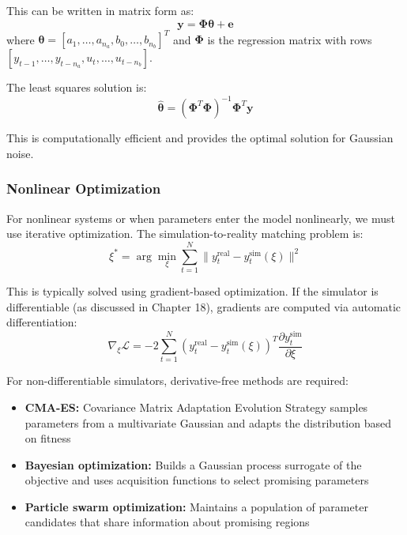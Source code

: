 This can be written in matrix form as:
\begin{equation}
\mathbf{y} = \mathbf{\Phi} \boldsymbol{\theta} + \mathbf{e}
\end{equation}
where $\boldsymbol{\theta} = [a_1, \ldots, a_{n_a}, b_0, \ldots, b_{n_b}]^T$ and $\mathbf{\Phi}$ is the regression matrix with rows $[y_{t-1}, \ldots, y_{t-n_a}, u_t, \ldots, u_{t-n_b}]$.

The least squares solution is:
\begin{equation}
\hat{\boldsymbol{\theta}} = (\mathbf{\Phi}^T \mathbf{\Phi})^{-1} \mathbf{\Phi}^T \mathbf{y}
\label{eq:least_squares_sysid}
\end{equation}

This is computationally efficient and provides the optimal solution for Gaussian noise.

\subsubsection{Nonlinear Optimization}

For nonlinear systems or when parameters enter the model nonlinearly, we must use iterative optimization. The simulation-to-reality matching problem is:
\begin{equation}
\xi^* = \arg\min_\xi \sum_{t=1}^{N} \| y_t^{\text{real}} - y_t^{\text{sim}}(\xi) \|^2
\end{equation}

This is typically solved using gradient-based optimization. If the simulator is differentiable (as discussed in Chapter 18), gradients are computed via automatic differentiation:
\begin{equation}
\nabla_\xi \mathcal{L} = -2 \sum_{t=1}^{N} (y_t^{\text{real}} - y_t^{\text{sim}}(\xi))^T \frac{\partial y_t^{\text{sim}}}{\partial \xi}
\end{equation}

For non-differentiable simulators, derivative-free methods are required:
\begin{itemize}
    \item \textbf{CMA-ES:} Covariance Matrix Adaptation Evolution Strategy samples parameters from a multivariate Gaussian and adapts the distribution based on fitness
    \item \textbf{Bayesian optimization:} Builds a Gaussian process surrogate of the objective and uses acquisition functions to select promising parameters
    \item \textbf{Particle swarm optimization:} Maintains a population of parameter candidates that share information about promising regions
\end{itemize}


